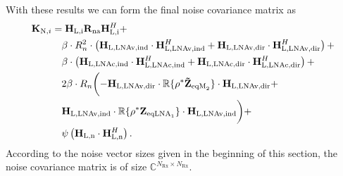 With these results we can form the final noise covariance matrix as 
\begin{align}
\label{eq:noise_cov}\nonumber
\mat{K}_{\text{N},i}%
&=\mat{H}_\text{L,i} \mat{R}_\text{na} \mat{H}_\text{L,i}^H+\\\nonumber
&\quad	\beta \cdot R_n^2\cdot \left(\mat{H}_\text{L,LNAv,ind}\cdot\mat{H}_\text{L,LNAv,ind}^H+
	\mat{H}_\text{L,LNAv,dir}\cdot\mat{H}_\text{L,LNAv,dir}^H\right)+\\\nonumber
&\quad	\beta \cdot \left(\mat{H}_\text{L,LNAc,ind}\cdot\mat{H}_\text{L,LNAc,ind}^H+
	\mat{H}_\text{L,LNAc,dir}\cdot\mat{H}_\text{L,LNAc,dir}^H\right)+\\\nonumber
&\quad	2\beta \cdot R_n\biggl(
	-\mat{H}_\text{L,LNAv,dir} \cdot\mathbb{R}\{\rho^*\mat{\tilde{Z}}_{\text{eqM}_2}\}\cdot
	\mat{H}_\text{L,LNAv,dir}+\\\nonumber
&\quad	\mat{H}_\text{L,LNAv,ind} \cdot\mathbb{R}\{\rho^*\mat{Z}_{\text{eqLNA}_1}\}\cdot
	\mat{H}_\text{L,LNAv,ind}\biggr)+\\
&\quad	\psi\left(\mat{H}_\text{L,n}\cdot\mat{H}_\text{L,n}^H\right).
\end{align}
According to the noise vector sizes given in the beginning of this section, the noise covariance matrix is of size $\mathbb{C}^{N_\text{Rx}\times N_\text{Rx}}$.









